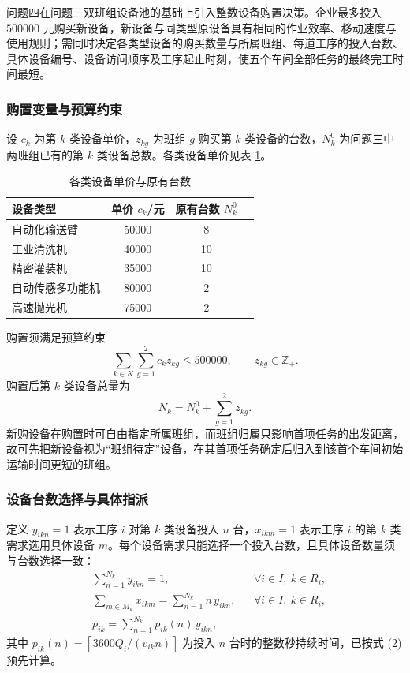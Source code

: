 \documentclass[12pt,a4paper]{article}
\begin{document}
问题四在问题三双班组设备池的基础上引入整数设备购置决策。企业最多投入 $500000$ 元购买新设备，新设备与同类型原设备具有相同的作业效率、移动速度与使用规则；需同时决定各类型设备的购买数量与所属班组、每道工序的投入台数、具体设备编号、设备访问顺序及工序起止时刻，使五个车间全部任务的最终完工时间最短。

\subsubsection{购置变量与预算约束}

设 $c_k$ 为第 $k$ 类设备单价，$z_{kg}$ 为班组 $g$ 购买第 $k$ 类设备的台数，$N_k^0$ 为问题三中两班组已有的第 $k$ 类设备总数。各类设备单价见表 \ref{tab:p4price}。

\begin{table}[H]
\centering
\caption{各类设备单价与原有台数}
\small
\label{tab:p4price}
\begin{tabular}{lccc}
\toprule
设备类型 & 单价 $c_k$/元 & 原有台数 $N_k^0$ \\
\midrule
自动化输送臂 & 50000 & 8 \\
工业清洗机 & 40000 & 10 \\
精密灌装机 & 35000 & 10 \\
自动传感多功能机 & 80000 & 2 \\
高速抛光机 & 75000 & 2 \\
\bottomrule
\end{tabular}
\end{table}

购置须满足预算约束
\begin{equation}
\sum_{k\in K}\sum_{g=1}^{2} c_k z_{kg}\le 500000,\qquad z_{kg}\in\mathbb{Z}_+ .
\label{eq:p4budget}
\end{equation}
购置后第 $k$ 类设备总量为
\begin{equation}
N_k=N_k^0+\sum_{g=1}^{2} z_{kg} .
\end{equation}
新购设备在购置时可自由指定所属班组，而班组归属只影响首项任务的出发距离，故可先把新设备视为“班组待定”设备，在其首项任务确定后归入到该首个车间初始运输时间更短的班组。

\subsubsection{设备台数选择与具体指派}

定义 $y_{ikn}=1$ 表示工序 $i$ 对第 $k$ 类设备投入 $n$ 台，$x_{ikm}=1$ 表示工序 $i$ 的第 $k$ 类需求选用具体设备 $m$。每个设备需求只能选择一个投入台数，且具体设备数量须与台数选择一致：
\begin{align}
&\sum_{n=1}^{N_k} y_{ikn}=1, && \forall i\in I,\ k\in R_i,\\
&\sum_{m\in M_k} x_{ikm}=\sum_{n=1}^{N_k} n\,y_{ikn}, && \forall i\in I,\ k\in R_i,\\
&p_{ik}=\sum_{n=1}^{N_k} p_{ik}(n)\,y_{ikn},
\end{align}
其中 $p_{ik}(n)=\left\lceil 3600 Q_i/(v_{ik}n)\right\rceil$ 为投入 $n$ 台时的整数秒持续时间，已按式 (2) 预先计算。
\end{document}
